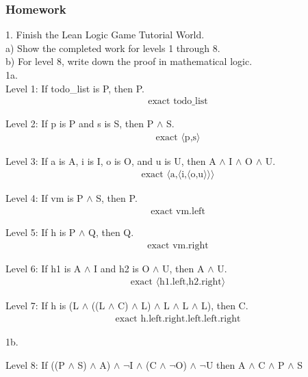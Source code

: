 \documentclass{article}
\theoremstyle{theorem}
\theoremstyle{definition}
\theoremstyle{remark}
\begin{document}
\subsubsection{Homework}

1. Finish the Lean Logic Game Tutorial World. \\
\hspace*{2em}a) Show the completed work for levels 1 through 8. \\
\hspace*{2em}b) For level 8, write down the proof in mathematical logic.\\

1a.\\
Level 1: If todo\_list is P, then P.
\begin{align*}
  \text{exact todo\_list}
\end{align*}

Level 2: If p is P and s is S, then P $\wedge$ S.
\begin{align*}
  \text{exact $\langle$p,s$\rangle$}
\end{align*}

Level 3: If a is A, i is I, o is O, and u is U, then A $\wedge$ I $\wedge$ O $\wedge$ U.
\begin{align*}
  \text{exact $\langle$a,$\langle$i,$\langle$o,u$\rangle$$\rangle$$\rangle$}
\end{align*}

Level 4: If vm is P $\wedge$ S, then P.
\begin{align*}
  \text{exact vm.left}
\end{align*}

Level 5: If h is P $\wedge$ Q, then Q.
\begin{align*}
  \text{exact vm.right}
\end{align*}

Level 6: If h1 is A $\wedge$ I and h2 is O $\wedge$ U, then A $\wedge$ U.
\begin{align*}
  \text{exact $\langle$h1.left,h2.right$\rangle$}
\end{align*}

Level 7: If h is (L $\wedge$ ((L $\wedge$ C) $\wedge$ L) $\wedge$ L $\wedge$ L $\wedge$ L), then C.
\begin{align*}
  \text{exact h.left.right.left.left.right}
\end{align*}

1b. 

Level 8: If ((P $\wedge$ S) $\wedge$ A) $\wedge$ $\neg$I $\wedge$ (C $\wedge$ $\neg$O) $\wedge$ $\neg$U then A $\wedge$ C $\wedge$ P $\wedge$ S
\end{document}
